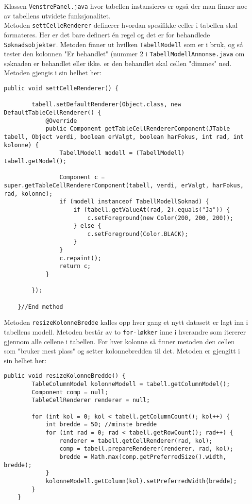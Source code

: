 Klassen \texttt{VenstrePanel.java} hvor tabellen instansieres er også der man finner noe av tabellens utvidete funksjonalitet.\\

Metoden \texttt{settCelleRenderer} definerer hvordan spesifikke celler i tabellen skal formateres. Her er det bare definert én regel og det er for behandlede \texttt{Søknadsobjekter}. Metoden finner ut hvilken \texttt{TabellModell} som er i bruk, og så tester den kolonnen "Er behandlet" (nummer 2 i \texttt{TabellModellAnnonse.java} om søknaden er behandlet eller ikke. er den behandlet skal cellen "dimmes" ned. Metoden gjengis i sin helhet her:

\begin{lstlisting}[caption=Metoden \texttt{settCelleRenderer} fra \texttt{VenstrePanel.java}]
    public void settCelleRenderer() {

        tabell.setDefaultRenderer(Object.class, new DefaultTableCellRenderer() {
            @Override
            public Component getTableCellRendererComponent(JTable tabell, Object verdi, boolean erValgt, boolean harFokus, int rad, int kolonne) {
                TabellModell modell = (TabellModell) tabell.getModel();

                Component c = super.getTableCellRendererComponent(tabell, verdi, erValgt, harFokus, rad, kolonne);
                if (modell instanceof TabellModellSoknad) {
                    if (tabell.getValueAt(rad, 2).equals("Ja")) {
                        c.setForeground(new Color(200, 200, 200));
                    } else {
                        c.setForeground(Color.BLACK);
                    }
                }
                c.repaint();
                return c;
            }

        });

    }//End method
\end{lstlisting}

Metoden \texttt{resizeKolonneBredde} kalles opp hver gang et nytt datasett er lagt inn i tabellens modell. Metoden består av to \texttt{for-løkker} inne i hverandre som itererer gjennom alle cellene i tabellen. For hver kolonne så finner metoden den cellen som "bruker mest plass" og setter kolonnebredden til det.
Metoden er gjengitt i sin helhet her:
\begin{lstlisting}[caption=Metoden \texttt{resizeKolonneBredde} fra klassen \texttt{VenstrePanel.java}]
    public void resizeKolonneBredde() {
        TableColumnModel kolonneModell = tabell.getColumnModel();
        Component comp = null;
        TableCellRenderer renderer = null;

        for (int kol = 0; kol < tabell.getColumnCount(); kol++) {
            int bredde = 50; //minste bredde
            for (int rad = 0; rad < tabell.getRowCount(); rad++) {
                renderer = tabell.getCellRenderer(rad, kol);
                comp = tabell.prepareRenderer(renderer, rad, kol);
                bredde = Math.max(comp.getPreferredSize().width, bredde);
            }
            kolonneModell.getColumn(kol).setPreferredWidth(bredde);
        }
    }
\end{lstlisting}

